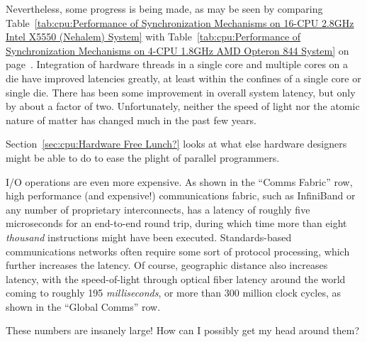 {	Nevertheless, some progress is being made, as may be seen
	by comparing
	Table~\ref{tab:cpu:Performance of Synchronization Mechanisms on 16-CPU 2.8GHz Intel X5550 (Nehalem) System}
	with
	Table~\ref{tab:cpu:Performance of Synchronization Mechanisms on 4-CPU 1.8GHz AMD Opteron 844 System}
	on
	page~\pageref{tab:cpu:Performance of Synchronization Mechanisms on 4-CPU 1.8GHz AMD Opteron 844 System}.
	Integration of hardware threads in a single core and multiple
	cores on a die have improved latencies greatly, at least within the
	confines of a single core or single die.
	There has been some improvement in overall system latency,
	but only by about a factor of two.
	Unfortunately, neither the speed of light nor the atomic nature
	of matter has changed much in the past few years.

	Section~\ref{sec:cpu:Hardware Free Lunch?}
	looks at what else hardware designers might be
	able to do to ease the plight of parallel programmers.
} \QuickQuizEnd

I/O operations are even more expensive.
As shown in the ``Comms Fabric'' row,
high performance (and expensive!) communications fabric, such as
InfiniBand or any number of proprietary interconnects, has a latency
of roughly five microseconds for an end-to-end round trip, during which
time more than eight \emph{thousand} instructions might have been executed.
Standards-based communications networks often require some sort of
protocol processing, which further increases the latency.
Of course, geographic distance also increases latency, with the
speed-of-light through optical fiber latency around the world coming to
roughly 195 \emph{milliseconds}, or more than 300 million clock
cycles, as shown in the ``Global Comms'' row.


\QuickQuiz{}
	These numbers are insanely large!
	How can I possibly get my head around them?
 \QuickQuizEnd

